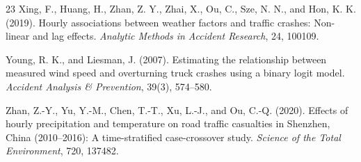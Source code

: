 \begin{thebibliography}{23}
Xing, F., Huang, H., Zhan, Z. Y., Zhai, X., Ou, C., Sze, N. N., and Hon, K. K. (2019).
\newblock Hourly associations between weather factors and traffic crashes: Non-linear and lag effects.
\newblock \emph{Analytic Methods in Accident Research}, 24, 100109.

Young, R. K., and Liesman, J. (2007).
\newblock Estimating the relationship between measured wind speed and overturning truck crashes using a binary logit model.
\newblock \emph{Accident Analysis \& Prevention}, 39(3), 574--580.

Zhan, Z.-Y., Yu, Y.-M., Chen, T.-T., Xu, L.-J., and Ou, C.-Q. (2020).
\newblock Effects of hourly precipitation and temperature on road traffic
casualties in Shenzhen, China (2010--2016): A time-stratified case-crossover study.
\newblock \emph{Science of the Total Environment}, 720, 137482.

\end{thebibliography}
